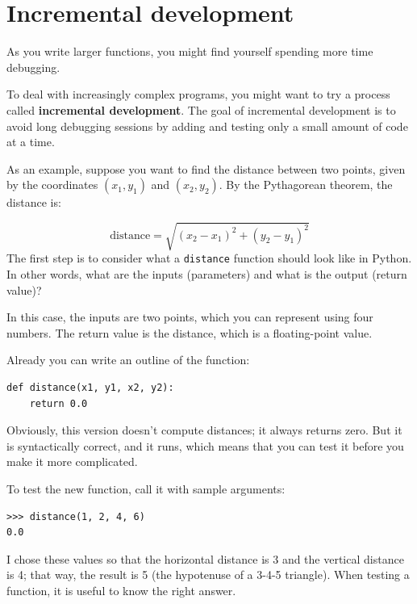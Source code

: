 \section{Incremental development}
\label{incremental development}

As you write larger functions, you might find yourself
spending more time debugging.

To deal with increasingly complex programs,
you might want to try a process called
{\bf incremental development}.  The goal of incremental development
is to avoid long debugging sessions by adding and testing only
a small amount of code at a time.


As an example, suppose you want to find the distance between two
points, given by the coordinates $(x_1, y_1)$ and $(x_2, y_2)$.
By the Pythagorean theorem, the distance is:

\begin{displaymath}
\mathrm{distance} = \sqrt{(x_2 - x_1)^2 + (y_2 - y_1)^2}
\end{displaymath}
%
The first step is to consider what a {\tt distance} function should
look like in Python.  In other words, what are the inputs (parameters)
and what is the output (return value)?

In this case, the inputs are two points, which you can represent
using four numbers.  The return value is the distance, which is
a floating-point value.

Already you can write an outline of the function:

\beforeverb
\begin{verbatim}
def distance(x1, y1, x2, y2):
    return 0.0
\end{verbatim}
\afterverb
%
Obviously, this version doesn't compute distances; it always returns
zero.  But it is syntactically correct, and it runs, which means that
you can test it before you make it more complicated.

To test the new function, call it with sample arguments:

\beforeverb
\begin{verbatim}
>>> distance(1, 2, 4, 6)
0.0
\end{verbatim}
\afterverb
%
I chose these values so that the horizontal distance is 3 and the
vertical distance is 4; that way, the result is 5
(the hypotenuse of a 3-4-5 triangle). When testing a function, it is
useful to know the right answer.

